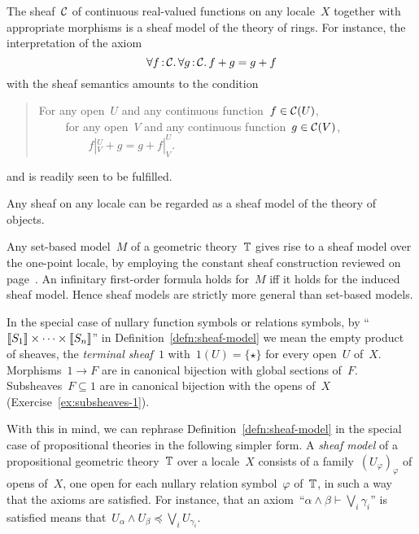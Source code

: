 \documentclass{ws-rv9x6}
\begin{document}
{\begin{example}The sheaf~$\mathcal{C}$ of continuous real-valued functions on any
locale~$X$ together with appropriate morphisms is a sheaf model of the theory
of rings. For instance, the interpretation of the axiom
\[ \forall f\,{:}\,\mathcal{C}\mathpunct{.} \forall g\,{:}\,\mathcal{C}\mathpunct{.} f + g = g + f \]
with the sheaf semantics amounts to the condition
\begin{quote}
For any open~$U$ and any continuous function~$f \in \mathcal{C}(U)$, \\
${\qquad}$ for any open~$V$ and any continuous function~$g \in \mathcal{C}(V)$, \\
${\qquad\qquad}$ $f|^U_V + g = g + f|^U_V$.
\end{quote}
and is readily seen to be fulfilled.
\end{example}

\begin{example}Any sheaf on any locale can be
regarded as a sheaf model of the theory of objects.\end{example}

\begin{example}\label{ex:sets-as-sheaf-models}
Any set-based model~$M$ of a geometric theory~$\mathbb{T}$ gives rise to a
sheaf model over the one-point locale, by employing the constant sheaf
construction reviewed on page~\pageref{page:constant-sheaf}. An infinitary
first-order formula holds for~$M$ iff it holds for the induced sheaf model.
Hence sheaf models are strictly more general than set-based models.
\end{example}

In the special case of nullary function symbols or relations symbols, by
``${\llbracket{S_1}\rrbracket} \times \cdots \times {\llbracket{S_n}\rrbracket}$'' in
Definition~\ref{defn:sheaf-model} we mean the empty product of sheaves, the
\emph{terminal sheaf}~$1$ with~$1(U) = \{\star\}$ for every open~$U$ of~$X$.
Morphisms~$1 \to F$ are in canonical bijection with global sections of~$F$.
Subsheaves~$F \subseteq 1$ are in canonical bijection with the opens of~$X$
(Exercise~\ref{ex:subsheaves-1}).

With this in mind, we can rephrase Definition~\ref{defn:sheaf-model} in the
special case of propositional theories in the following simpler form. A
\emph{sheaf model} of a propositional geometric theory~$\mathbb{T}$ over a locale~$X$
consists of a family~$(U_\varphi)_\varphi$ of opens of~$X$, one open for each
nullary relation symbol~$\varphi$ of~$\mathbb{T}$, in such a way that the axioms are
satisfied. For instance, that an axiom~``$\alpha \wedge \beta \vdash \bigvee_i
\gamma_i$'' is satisfied means that~$U_\alpha \wedge U_\beta \preceq \bigvee_i
U_{\gamma_i}$.

}
\end{document}
